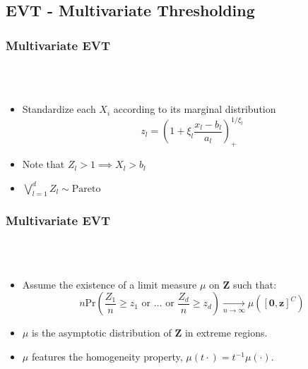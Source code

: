 \documentclass[aspectratio=169]{beamer}
\begin{document}
\subsection{EVT - Multivariate Thresholding}

\begin{frame}
  \frametitle{Multivariate EVT}
  {\scriptsize\cite{ferreira2014}}\\~\vspace{0.3cm}\\
  \begin{itemize}
    \item Standardize each $X_i$ according to its marginal distribution
        \begin{equation*}
          z_l = \left(1 + \xi_l\frac{x_l - b_{l}}{a_{l}}\right)_{+}^{1/\xi_l}
        \end{equation*}
    \item Note that $Z_l > 1\implies X_l > b_{l}$
    \item $\bigvee_{l=1}^d Z_l \sim \text{Pareto}$
  \end{itemize}
\end{frame} %

\begin{frame}
  \frametitle{Multivariate EVT}
  {\scriptsize\cite{ferreira2014}}\\~\vspace{0.3cm}\\
  \begin{itemize}
    \item Assume the existence of a limit measure $\mu$ on $\bm{Z}$ such that:
    \begin{equation*}
      n\text{Pr}\left(\frac{Z_1}{n} \geq z_1 \text{ or }\ldots\text{ or }\frac{Z_d}{n}\geq z_d\right)
      \xrightarrow[n\to\infty]{} \mu\left([\bm{0}, \bm{z}]^C\right)
    \end{equation*}
    \item $\mu$ is the asymptotic distribution of $\bm{Z}$ in extreme regions.
    \item $\mu$ features the homogeneity property, $\mu(t\cdot) = t^{-1}\mu(\cdot)$.
  \end{itemize}
\end{frame}
\end{document}
